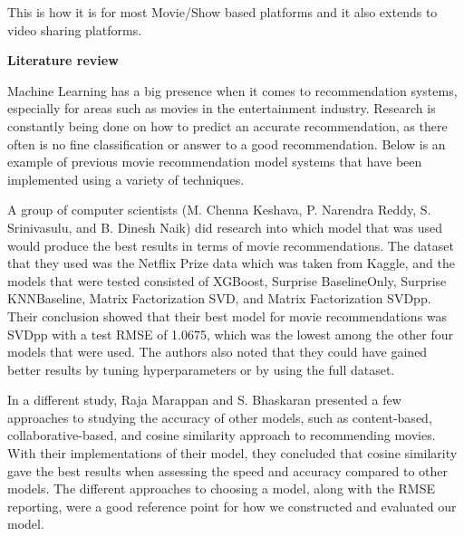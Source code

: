 \documentclass[11pt]{article}
\begin{document}
\vspace{0.3cm}

This is how it is for most Movie/Show based platforms and it also extends to video sharing platforms.

\vspace{0.3cm}

    \begin{flushleft}
        \textbf{\LARGE Literature review}
    \end{flushleft}

\vspace{0.3cm}

Machine Learning has a big presence when it comes to recommendation systems, especially for areas such as movies in the entertainment industry. Research is constantly being done on how to predict an accurate recommendation, as there often is no fine classification or answer to a good recommendation. Below is an example of previous movie recommendation model systems that have been implemented using a variety of techniques.
\vspace{0.3cm}

A group of computer scientists (M. Chenna Keshava, P. Narendra Reddy, S. Srinivasulu, and B. Dinesh Naik) did research into which model that was used would produce the best results in terms of movie recommendations. The dataset that they used was the Netflix Prize data which was taken from Kaggle, and the models that were tested consisted of XGBoost, Surprise BaselineOnly, Surprise KNNBaseline, Matrix Factorization SVD, and Matrix Factorization SVDpp. Their conclusion showed that their best model for movie recommendations was SVDpp with a test RMSE of 1.0675, which was the lowest among the other four models that were used. The authors also noted that they could have gained better results by tuning hyperparameters or by using the full dataset.

\vspace{0.3cm}

In a different study, Raja Marappan and S. Bhaskaran presented a few approaches to studying the accuracy of other models, such as content-based, collaborative-based, and cosine similarity approach to recommending movies. With their implementations of their model, they concluded that cosine similarity gave the best results when assessing the speed and accuracy compared to other models. 
\vspace{0.3cm}
The different approaches to choosing a model, along with the RMSE reporting, were a good reference point for how we constructed and evaluated our model.
\end{document}
